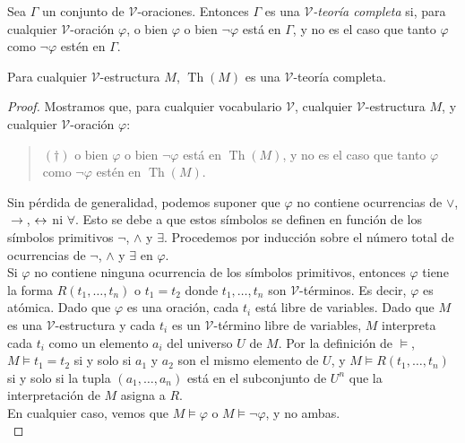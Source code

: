 \documentclass[12pt,a4paper]{book}
\newcommand{\VV}{\mathcal{V}}
\DeclareMathOperator{\Th}{Th}
\begin{document}
    \begin{definicion}\label{def:teoria-completa}
        Sea $\Gamma$ un conjunto de $\VV$-oraciones. Entonces $\Gamma$ es una \textit{$\VV$-teoría completa} si, para
        cualquier $\VV$-oración $\varphi$, o bien $\varphi$ o bien $\neg\varphi$ está en $\Gamma$, y no es el caso que
        tanto $\varphi$ como $\neg\varphi$ estén en $\Gamma$.
    \end{definicion}

    \begin{proposicion}\label{prop:teoria-completa-de-estructura}
        Para cualquier $\VV$-estructura $M$, $\Th(M)$ es una $\VV$-teoría completa.
    \end{proposicion}
    \begin{proof}
        Mostramos que, para cualquier vocabulario $\VV$, cualquier $\VV$-estructura $M$, y cualquier $\VV$-oración
        $\varphi$:
        \begin{quote}
            $(\dagger)$ o bien $\varphi$ o bien $\neg\varphi$ está en $\Th(M)$, y no es el caso que tanto $\varphi$ como
            $\neg\varphi$ estén en $\Th(M)$.
        \end{quote}
        Sin pérdida de generalidad, podemos suponer que $\varphi$ no contiene ocurrencias de $\vee$, $\rightarrow$, $\leftrightarrow$
        ni $\forall$. Esto se debe a que estos símbolos se definen en función de los símbolos primitivos $\neg$, $\wedge$
        y $\exists$. Procedemos por inducción sobre el número total de ocurrencias de $\neg$, $\wedge$ y $\exists$ en
        $\varphi$.\\
        Si $\varphi$ no contiene ninguna ocurrencia de los símbolos primitivos, entonces $\varphi$ tiene la forma
        $R(t_{1},\dots,t_{n})$ o $t_{1}=t_{2}$ donde $t_{1},\dots,t_{n}$ son $\VV$-términos. Es decir, $\varphi$ es
        atómica. Dado que $\varphi$ es una oración, cada $t_{i}$ está libre de variables. Dado que $M$ es una
        $\VV$-estructura y cada $t_{i}$ es un $\VV$-término libre de variables, $M$ interpreta cada $t_{i}$ como un
        elemento $a_{i}$ del universo $U$ de $M$. Por la definición de $\models$, $M\models t_{1}=t_{2}$ si y solo si
        $a_{1}$ y $a_{2}$ son el mismo elemento de $U$, y $M\models R(t_{1},\dots,t_{n})$ si y solo si la tupla
        $(a_{1},\dots,a_{n})$ está en el subconjunto de $U^{n}$ que la interpretación de $M$ asigna a $R$.\\
        En cualquier caso, vemos que $M\models\varphi$ o $M\models\neg\varphi$, y no ambas.\\

\end{proof}
\end{document}
